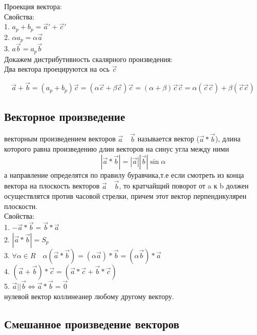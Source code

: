 \documentclass[a4paper, 12pt]{article}
\begin{document}
Проекция вектора:\\
Свойства:\\
1. $ a_p + b_p = \vec{a}' + \vec{c}' $\\
2. $ \alpha a_p = \alpha \vec{a} $\\
3. $ a \vec{b} = a_p \vec{b} $\\

\newpage
Докажем дистрибутивность скалярного произведения:\\
Два вектора проецируются на ось $ \vec{c} $
\begin{mdframed}[backgroundcolor=blue!20] 
\[
	\vec{a} + \vec{b} = (a_p + b_p)\vec{c}=(\alpha \vec{c} + \beta \vec{c})\vec{c} = (\alpha + \beta)\vec{c}\vec{c} = \alpha(\vec{c}\vec{c})+ \beta(\vec{c}\vec{c})	
\]
\end{mdframed}

\subsection{Векторное произведение}
векторным произведением векторов $ \vec{a} \quad \vec{b} $ называется вектор ($ \vec{a}*\vec{b} $), длина которого равна произведению длин векторов на синус угла между ними \[  |\vec{a}* \vec{b}|=|\vec{a}||\vec{b}| \sin \alpha \] а направление определятся по правилу буравчика,т.е если смотреть из конца вектора на плоскость векторов $ \vec{a} \quad \vec{b} $, то кратчайщий поворот от a к b должен осуществлятся против часовой стрелки, причем этот вектор перпендикулярен плоскости.\\

Свойства:\\
1. $ -\vec{a}*\vec{b} = \vec{b}*\vec{a} $\\
2. $  |\vec{a}*\vec{b}| = S_p$\\
3. $  \forall \alpha \in R \quad \alpha(\vec{a}*\vec{b})=(\alpha \vec{a}) * \vec{b}=(\alpha \vec{b}) * \vec{a}$\\
4. $  (\vec{a} + \vec{b})*\vec{c} = (\vec{a}*\vec{c} + \vec{b}*\vec{c})$\\
5. $  \vec{a} || \vec{b} \Leftrightarrow \vec{a}*\vec{b} = \vec{0} $\\
нулевой вектор коллинеанер любому другому вектору.\\

\subsection{Смешанное произведение векторов}
\end{document}
